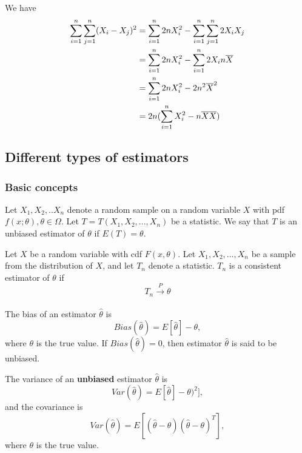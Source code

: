 \begin{refsection}
\begin{remark}
We have
\begin{align*}
\sum_{i=1}^n\sum_{j=1}^n (X_i - X_j)^2 &= \sum_{i=1}^n 2n X_i^2 - \sum_{i=1}^n\sum_{j=1}^n 2X_iX_j \\
&= \sum_{i=1}^n 2n X_i^2 - \sum_{i=1}^n 2X_in\overline{X} \\
&= \sum_{i=1}^n 2n X_i^2 - 2n^2\overline{X}^2 \\
&= 2n(\sum_{i=1}^n X_i^2 - n\overline{X}\overline{X})
\end{align*}

	
\end{remark}


\subsection{Different types of estimators}
\subsubsection{Basic concepts}
\begin{definition}
Let $X_1,X_2,..X_n$ denote a random sample on a random variable $X$ with pdf $f(x;\theta),\theta \in \Omega$. Let $T=T(X_1,X_2,...,X_n)$ be a statistic. We say that $T$ is an unbiased estimator of $\theta$ if $E(T)=\theta$.
\end{definition}


\begin{definition}
Let $X$ be a random variable with cdf $F(x,\theta)$. Let $X_1,X_2,...,X_n$ be a sample from the distribution of $X$, and let $T_n$ denote a statistic. $T_n$ is a consistent estimator of $\theta$ if
$$T_n \xrightarrow[ ]{P} \theta $$
\end{definition}



\begin{definition}
The bias of an estimator $\hat{\theta}$ is $$Bias(\hat{\theta}) = E[\hat{\theta}] - \theta,$$ 
where $\theta$ is the true value. If $Bias(\hat{\theta}) = 0$, then estimator $\hat{\theta}$ is said to be unbiased. 
\end{definition}


\begin{definition}
	The variance of an \textbf{unbiased} estimator $\hat{\theta}$ is $$Var(\hat{\theta}) = E[\hat{\theta}] - \theta)^2],$$
	and the covariance is
	$$Var(\hat{\theta}) = E[(\hat{\theta} - \theta)(\hat{\theta} - \theta)^T],$$
	where $\theta$ is the true value. 
\end{definition}


\end{refsection}
